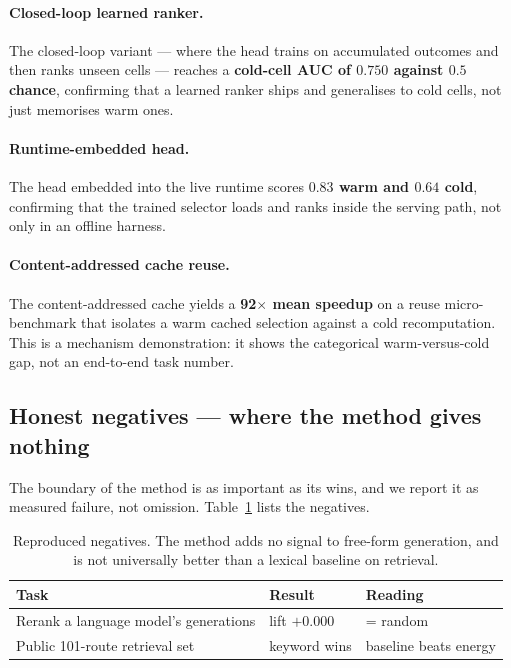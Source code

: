 \documentclass[11pt]{article}
\begin{document}
\paragraph{Closed-loop learned ranker.} The closed-loop variant --- where the head
trains on accumulated outcomes and then ranks unseen cells --- reaches a
\textbf{cold-cell AUC of $0.750$ against $0.5$ chance}, confirming that a learned
ranker ships and generalises to cold cells, not just memorises warm ones.

\paragraph{Runtime-embedded head.} The head embedded into the live runtime scores
\textbf{$0.83$ warm and $0.64$ cold}, confirming that the trained selector loads
and ranks inside the serving path, not only in an offline harness.

\paragraph{Content-addressed cache reuse.} The content-addressed cache yields a
\textbf{92$\times$ mean speedup} on a reuse micro-benchmark that isolates a warm
cached selection against a cold recomputation. This is a mechanism demonstration:
it shows the categorical warm-versus-cold gap, not an end-to-end task number.

\subsection{Honest negatives --- where the method gives nothing}
The boundary of the method is as important as its wins, and we report it as
measured failure, not omission. Table~\ref{tab:neg} lists the negatives.

\begin{table}[h]
\centering
\begin{tabular}{lll}
\toprule
Task & Result & Reading \\
\midrule
Rerank a language model's generations & lift $+0.000$ & = random \\
Public 101-route retrieval set & keyword wins & baseline beats energy \\
\bottomrule
\end{tabular}
\caption{Reproduced negatives. The method adds no signal to free-form generation,
and is not universally better than a lexical baseline on retrieval.}
\label{tab:neg}
\end{table}
\end{document}
